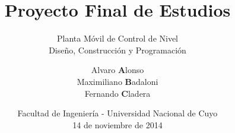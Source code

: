 
\title[{\makebox[.5\paperwidth]{PFE: Planta Móvil de Control de Nivel\hfill%
       \insertframenumber/\inserttotalframenumber}}]{Proyecto Final de Estudios}

\subtitle{Planta Móvil de Control de Nivel\\Diseño, Construcción y
Programación}
\author{\texorpdfstring{Alvaro \textbf{A}lonso\\
			Maximiliano \textbf{B}adaloni\\
			Fernando \textbf{C}ladera}
			{Alonso Badaloni Cladera}
	}


\date{
  \scriptsize Facultad de Ingeniería - Universidad Nacional de Cuyo
  \\
  \vspace{.10cm}
  14 de noviembre de 2014
  \ifdebug
  \fi
}
